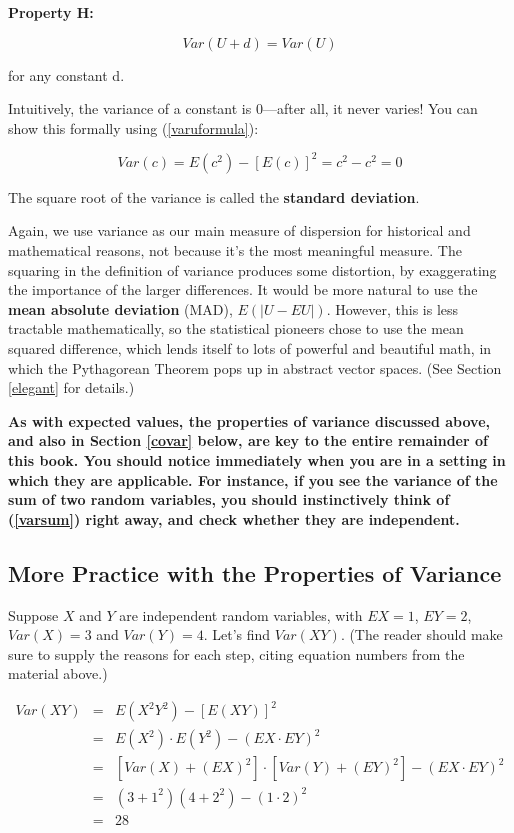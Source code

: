 {\bf Property H:}

\begin{equation}
\label{affinevar}
Var(U+d) = Var(U)
\end{equation}

for any constant d.

Intuitively, the variance of a constant is 0---after all, it never
varies!  You can show this formally using (\ref{varuformula}):

\begin{equation}
Var(c) = E(c^2) - [E(c)]^2 = c^2 - c^2 = 0
\end{equation}

The square root of the variance is called the {\bf standard deviation}.

Again, we use variance as our main measure of dispersion for historical
and mathematical reasons, not because it's the most meaningful measure.
The squaring in the definition of variance produces some distortion, by
exaggerating the importance of the larger differences.  It would be more
natural to use the {\bf mean absolute deviation} (MAD), $E(|U-EU|)$.
However, this is less tractable mathematically, so the statistical
pioneers chose to use the mean squared difference, which lends itself to
lots of powerful and beautiful math, in which the Pythagorean Theorem
pops up in abstract vector spaces.  (See Section \ref{elegant} for
details.)

{\bf As with expected values, the properties of variance discussed
above, and also in Section \ref{covar} below, are key to the entire
remainder of this book.  You should notice immediately when you are in a
setting in which they are applicable.  For instance, if you see the
variance of the sum of two random variables, you should instinctively
think of (\ref{varsum}) right away, and check whether they are
independent.}

\subsection{More Practice with the Properties of Variance}

Suppose $X$ and $Y$ are independent random variables, with $EX = 1$, $EY
= 2$, $Var(X) = 3$ and $Var(Y) = 4$.  Let's find $Var(XY)$.  (The reader
should make sure to supply the reasons for each step, citing equation
numbers from the material above.)

\begin{eqnarray}
Var(XY) &=& E(X^2 Y^2) - [E(XY)]^2 \\
&=& E(X^2) \cdot E(Y^2) - (EX \cdot EY)^2 \\ 
&=& [Var(X) + (EX)^2] \cdot
[Var(Y) + (EY)^2] - (EX \cdot EY)^2 \label{genform} \\
&=& (3 + 1^2) (4 + 2^2) - (1 \cdot 2)^2 \\
&=& 28
\end{eqnarray}

